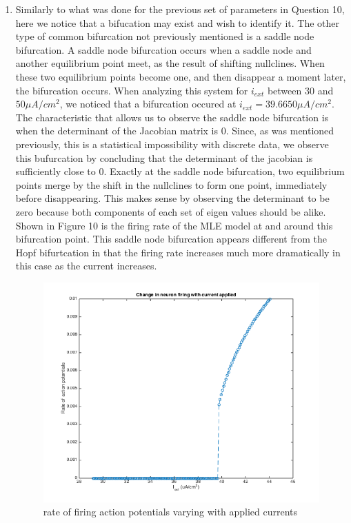 \documentclass[10pt]{report}
\begin{document}
\begin{enumerate}
\item Similarly to what was done for the previous set of parameters in Question 10, here we notice that a bifucation may exist and wish to identify it. The other type of common bifurcation not previously mentioned is a saddle node bifurcation. A saddle node bifurcation occurs when a saddle node and another equilibrium point meet, as the result of shifting nullclines. When these two equilibrium points become one, and then disappear a moment later, the bifurcation occurs. When analyzing this system for $i_{ext}$ between $30$ and $50 \mu A/cm^2$, we noticed that a bifurcation occured at $i_{ext} = 39.6650 \mu A/cm^2$. The characteristic that allows us to observe the saddle node bifurcation is when the determinant of the Jacobian matrix is 0. Since, as was mentioned previously, this is a statistical impossibility with discrete data, we observe this bufurcation by concluding that the determinant of the jacobian is sufficiently close to 0. Exactly at the saddle node bifurcation, two equilibrium points merge by the shift in the nullclines to form one point, immediately before disappearing. This makes sense by observing the determinant to be zero because both components of each set of eigen values should be alike. Shown in Figure 10 is the firing rate of the MLE model at and around this bifurcation point. This saddle node bifurcation appears different from the Hopf bifurtcation in that the firing rate increases much more dramatically in this case as the current increases. \begin{figure}[h!] \includegraphics[scale=0.5]{motnq12.png} \caption[h10]{rate of firing action potentials varying with applied currents} \end{figure}

\end{enumerate}
\end{document}
